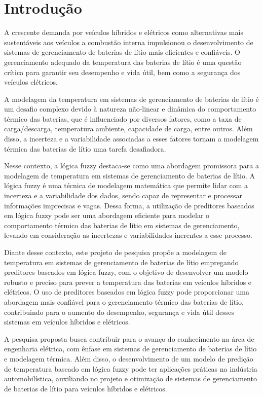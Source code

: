 \section{Introdução}  
A crescente demanda por veículos híbridos e elétricos como alternativas mais sustentáveis aos veículos a combustão interna impulsionou o desenvolvimento de sistemas de gerenciamento de baterias de lítio mais eficientes e confiáveis. O gerenciamento adequado da temperatura das baterias de lítio é uma questão crítica para garantir seu desempenho e vida útil, bem como a segurança dos veículos elétricos.

A modelagem da temperatura em sistemas de gerenciamento de baterias de lítio é um desafio complexo devido à natureza não-linear e dinâmica do comportamento térmico das baterias, que é influenciado por diversos fatores, como a taxa de carga/descarga, temperatura ambiente, capacidade de carga, entre outros. Além disso, a incerteza e a variabilidade associadas a esses fatores tornam a modelagem térmica das baterias de lítio uma tarefa desafiadora.

Nesse contexto, a lógica fuzzy destaca-se como uma abordagem promissora para a modelagem de temperatura em sistemas de gerenciamento de baterias de lítio. A lógica fuzzy é uma técnica de modelagem matemática que permite lidar com a incerteza e a variabilidade dos dados, sendo capaz de representar e processar informações imprecisas e vagas. Dessa forma, a utilização de preditores baseados em lógica fuzzy pode ser uma abordagem eficiente para modelar o comportamento térmico das baterias de lítio em sistemas de gerenciamento, levando em consideração as incertezas e variabilidades inerentes a esse processo.

Diante desse contexto, este projeto de pesquisa propõe a modelagem de temperatura em sistemas de gerenciamento de baterias de lítio empregando preditores baseados em lógica fuzzy, com o objetivo de desenvolver um modelo robusto e preciso para prever a temperatura das baterias em veículos híbridos e elétricos. O uso de preditores baseados em lógica fuzzy pode proporcionar uma abordagem mais confiável para o gerenciamento térmico das baterias de lítio, contribuindo para o aumento do desempenho, segurança e vida útil desses sistemas em veículos híbridos e elétricos.

A pesquisa proposta busca contribuir para o avanço do conhecimento na área de engenharia elétrica, com ênfase em sistemas de gerenciamento de baterias de lítio e modelagem térmica. Além disso, o desenvolvimento de um modelo de predição de temperatura baseado em lógica fuzzy pode ter aplicações práticas na indústria automobilística, auxiliando no projeto e otimização de sistemas de gerenciamento de baterias de lítio para veículos híbridos e elétricos.